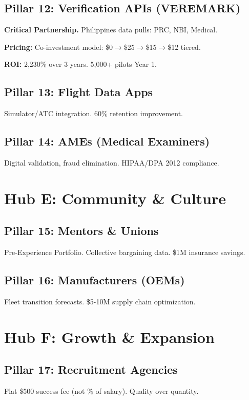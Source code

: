 \documentclass[11pt, a4paper]{article}
\begin{document}
\subsection{Pillar 12: Verification APIs (VEREMARK)}
\textbf{Critical Partnership.} Philippines data pulls: PRC, NBI, Medical.

\textbf{Pricing:} Co-investment model: \$0$\rightarrow$\$25$\rightarrow$\$15$\rightarrow$\$12 tiered.

\textbf{ROI:} 2,230\% over 3 years. 5,000+ pilots Year 1.

\subsection{Pillar 13: Flight Data Apps}
Simulator/ATC integration. 60\% retention improvement.

\subsection{Pillar 14: AMEs (Medical Examiners)}
Digital validation, fraud elimination. HIPAA/DPA 2012 compliance.

\section{Hub E: Community \& Culture}

\subsection{Pillar 15: Mentors \& Unions}
Pre-Experience Portfolio. Collective bargaining data. \$1M insurance savings.

\subsection{Pillar 16: Manufacturers (OEMs)}
Fleet transition forecasts. \$5-10M supply chain optimization.

\section{Hub F: Growth \& Expansion}

\subsection{Pillar 17: Recruitment Agencies}
Flat \$500 success fee (not \% of salary). Quality over quantity.
\end{document}

